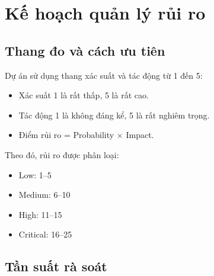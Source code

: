 \fi
\section{Kế hoạch quản lý rủi ro}

\subsection{Thang đo và cách ưu tiên}

Dự án sử dụng thang xác suất và tác động từ 1 đến 5:

\begin{itemize}
  \item Xác suất 1 là rất thấp, 5 là rất cao.
  \item Tác động 1 là không đáng kể, 5 là rất nghiêm trọng.
  \item Điểm rủi ro = Probability $\times$ Impact.
\end{itemize}

Theo đó, rủi ro được phân loại:

\begin{itemize}
  \item Low: 1--5
  \item Medium: 6--10
  \item High: 11--15
  \item Critical: 16--25
\end{itemize}

\subsection{Tần suất rà soát}

